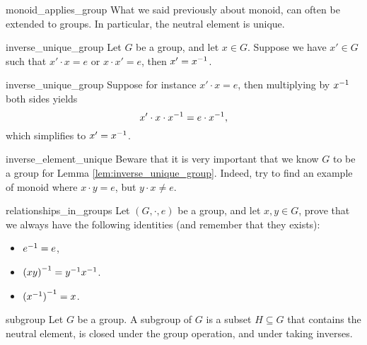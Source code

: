 \begin{crem}{}{monoid_applies_group}
    What we said previously about monoid, can often be extended to groups. In particular, the neutral element is unique.
\end{crem}

\begin{clem}{}{inverse_unique_group}
    Let \( G \) be a group, and let \( x \in G \). Suppose we have \( x' \in G \) such that \( x' \cdot x = e \) or \( x \cdot x' = e \), then \( x' = {x}^{-1} \).
\end{clem}
\begin{lemproof}{inverse_unique_group}
    Suppose for instance \( x' \cdot x = e \), then multiplying by \( {x}^{-1} \) both sides yields
    \begin{equation*}
        x' \cdot x \cdot {x}^{-1} = e \cdot {x}^{-1},
    \end{equation*}
    which simplifies to \( x' = {x}^{-1} \). 
\end{lemproof}

\begin{crem}{}{inverse_element_unique}
    Beware that it is very important that we know \( G \) to be a group for Lemma \ref{lem:inverse_unique_group}. Indeed, try to find an example of monoid where \( x \cdot y = e \), but \( y \cdot x \neq e \). 
\end{crem}

\begin{cex}{}{relationships_in_groups}
    Let \( (G, \cdot, e) \) be a group, and let \( x, y \in G \), prove that we always have the following identities (and remember that they exists):
    \begin{itemize}
        \item \( {e}^{-1} = e \),
        \item \( {(xy)}^{-1} = {y}^{-1} {x}^{-1} \).
        \item \( {({x}^{-1})}^{-1} = x \).
    \end{itemize} 
\end{cex}

\begin{cdef}{}{subgroup}
    Let \( G \) be a group. A subgroup of \( G \) is a subset \( H \subseteq G \) that contains the neutral element, is closed under the group operation, and under taking inverses.
\end{cdef}

